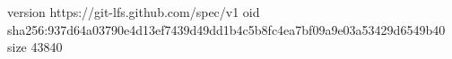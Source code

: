 version https://git-lfs.github.com/spec/v1
oid sha256:937d64a03790e4d13ef7439d49dd1b4c5b8fc4ea7bf09a9e03a53429d6549b40
size 43840
